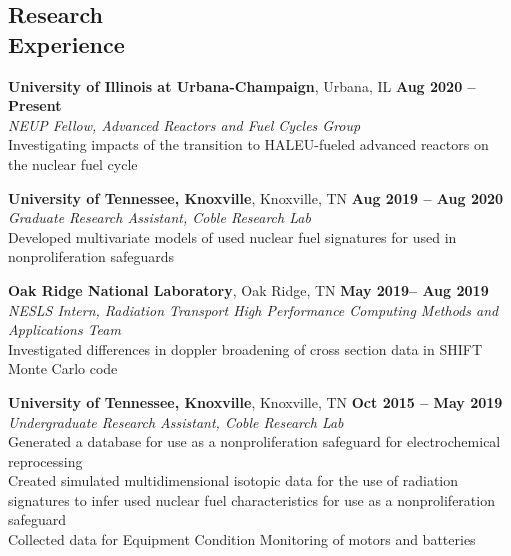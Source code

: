 \documentclass[margin,line]{resume}
\begin{document}
\begin{resume}
    \section{\mysidestyle Research\\Experience}
    \textbf{University of Illinois at Urbana-Champaign}, Urbana, IL \hfill \textbf{Aug 2020 -- Present} \\
                \textsl{NEUP Fellow, Advanced Reactors and Fuel Cycles Group} \\
                Investigating impacts of the transition to HALEU-fueled advanced 
                reactors on the nuclear fuel cycle

    \textbf{University of Tennessee, Knoxville}, Knoxville, TN \hfill \textbf{Aug 2019 -- Aug 2020}\\
                \textsl{Graduate Research Assistant, Coble Research Lab} \\ 
                Developed multivariate models of used nuclear fuel signatures for 
                used in nonproliferation safeguards 

    \textbf{Oak Ridge National Laboratory}, Oak Ridge, TN \hfill \textbf{May 2019-- Aug 2019}\\
                \textsl{NESLS Intern, Radiation Transport High Performance Computing Methods and Applications Team}\\
                Investigated differences in doppler broadening of cross section data in SHIFT Monte Carlo code

    \textbf{University of Tennessee, Knoxville}, Knoxville, TN \hfill \textbf{Oct 2015 -- May 2019}\\
                \textsl{Undergraduate Research Assistant, Coble Research Lab}\\
                Generated a database for use as a nonproliferation safeguard for electrochemical reprocessing \\
                Created simulated multidimensional isotopic data for the use of radiation signatures to infer used nuclear fuel characteristics for use as a nonproliferation safeguard\\ 
                Collected data for Equipment Condition Monitoring of motors and batteries

\end{resume}
\end{document}
